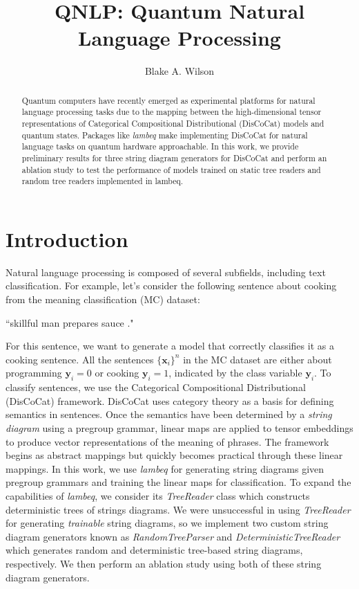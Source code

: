 \documentclass[12pt ]{article}
\title{QNLP: Quantum Natural Language Processing}
\author{Blake A. Wilson}
\def\y{\mathbf{y}}
\def\x{\mathbf{x}}
\begin{document}
\maketitle

\begin{abstract}
  Quantum computers have recently emerged as experimental platforms for natural language processing tasks due to the mapping between the high-dimensional tensor representations of Categorical Compositional Distributional (DisCoCat) models and quantum states.  Packages like {\it lambeq} make implementing DisCoCat for natural language tasks on quantum hardware approachable. In this work, we provide preliminary results for three string diagram generators for DisCoCat and perform an ablation study to test the performance of models trained on static tree readers and random tree readers implemented in lambeq. 

\end{abstract}
\section{Introduction}
Natural language processing is composed of several subfields, including text classification. For example, let's consider the following sentence about cooking from the meaning classification (MC) dataset:
\begin{center}
``skillful man prepares sauce ."
\end{center}
For this sentence, we want to generate a model that correctly classifies it as a cooking sentence. 
All the sentences $\{\x_i\}^n$ in the MC dataset are either about programming $\y_i = 0$ or cooking $\y_i = 1$, indicated by the class variable $\y_i$. To classify sentences, we use the Categorical Compositional Distributional (DisCoCat) framework. DisCoCat uses category theory as a basis for defining semantics in sentences. Once the semantics have been determined by a {\it string diagram} using a pregroup grammar, linear maps are applied to tensor embeddings to produce vector representations of the meaning of phrases. The framework begins as abstract mappings but quickly becomes practical through these linear mappings. In this work, we use {\it lambeq} for generating string diagrams given pregroup grammars and training the linear maps for classification. To expand the capabilities of {\it lambeq}, we consider its {\it TreeReader} class which constructs deterministic trees of strings diagrams. We were unsuccessful in using {\it TreeReader} for generating { \it trainable} string diagrams, so we implement two custom string diagram generators known as {\it RandomTreeParser} and {\it DeterministicTreeReader} which generates random and deterministic tree-based string diagrams, respectively. We then perform an ablation study using both of these string diagram generators.
\end{document}
